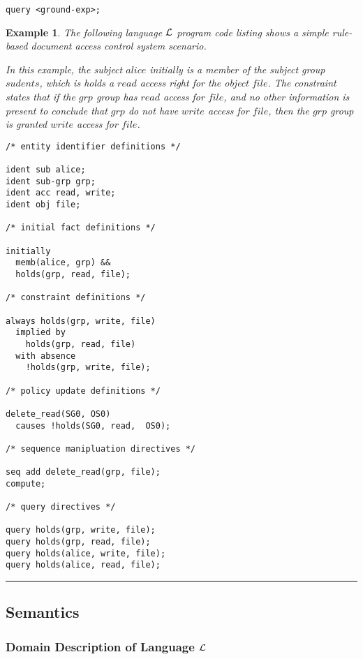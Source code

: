 \documentclass[10pt, twocolumn]{article}
\newtheorem{examp}{Example}
\newenvironment{example}{\begin{examp}\rm}{\rule{2mm}{2mm}\end{examp}}
\begin{document}
          \begin{verbatim}query <ground-exp>;\end{verbatim} 

        \begin{example}
          The following language ${\cal L}$ program code listing shows a simple
          rule-based document access control system scenario.

          In this example, the subject $alice$ initially is a member of the
          subject group $sudents$, which is holds a $read$ access right for the
          object $file$. The constraint states that if the $grp$ group
          has $read$ access for $file$, and no other information is present to
          conclude that $grp$ do not have $write$ access for $file$, then
          the $grp$ group is granted $write$ access for $file$.

          \begin{verbatim}
/* entity identifier definitions */

ident sub alice;
ident sub-grp grp;
ident acc read, write;
ident obj file;

/* initial fact definitions */

initially 
  memb(alice, grp) &&
  holds(grp, read, file);

/* constraint definitions */

always holds(grp, write, file)
  implied by
    holds(grp, read, file)
  with absence
    !holds(grp, write, file);

/* policy update definitions */

delete_read(SG0, OS0)
  causes !holds(SG0, read,  OS0);

/* sequence manipluation directives */

seq add delete_read(grp, file);
compute;

/* query directives */

query holds(grp, write, file);
query holds(grp, read, file);
query holds(alice, write, file);
query holds(alice, read, file);
          \end{verbatim}
        \end{example}

    \subsection{Semantics}

      \subsubsection{Domain Description of Language ${\cal L}$}
\end{document}
